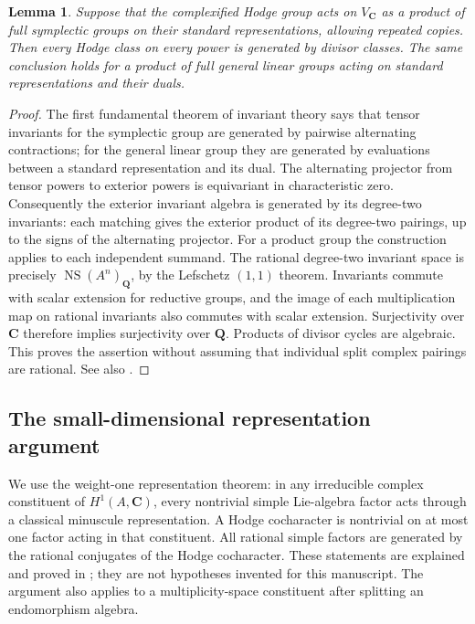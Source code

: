 \documentclass[11pt,reqno]{article}
\theoremstyle{emphasizedplain}
\theoremstyle{emphasizeddefinition}
\theoremstyle{emphasizeddefinition}
\newtheorem{prelemma}{Lemma}
\DeclareMathOperator{\NS}{NS}
\newcommand{\Q}{\mathbf Q}
\newcommand{\C}{\mathbf C}
\begin{document}
\begin{prelemma}\label{p:fft}
Suppose that the complexified Hodge group acts on $V_\C$ as a product of full
symplectic groups on their standard representations, allowing repeated
copies. Then every Hodge class on every power is generated by divisor
classes. The same conclusion holds for a product of full general linear
groups acting on standard representations and their duals.
\end{prelemma}
\begin{proof}
The first fundamental theorem of invariant theory says that tensor
invariants for the symplectic group are generated by pairwise alternating
contractions; for the general linear group they are generated by evaluations
between a standard representation and its dual. The alternating projector
from tensor powers to exterior powers is equivariant in characteristic zero.
Consequently the exterior invariant algebra is generated by its degree-two
invariants: each matching gives the exterior product of its degree-two
pairings, up to the signs of the alternating projector.
For a product group the construction applies to each independent summand.
The rational degree-two invariant space is precisely $\NS(A^n)_\Q$, by the
Lefschetz $(1,1)$ theorem. Invariants commute with scalar extension for
reductive groups, and the image of each multiplication map on rational
invariants also commutes with scalar extension. Surjectivity over $\C$
therefore implies surjectivity over $\Q$. Products of divisor cycles are
algebraic. This proves the assertion without assuming that individual split
complex pairings are rational. See also \cite[Theorem 2.14]{Moonen}.
\end{proof}

\subsection*{The small-dimensional representation argument}
We use the weight-one representation theorem: in any irreducible complex
constituent of $H^1(A,\C)$, every nontrivial simple Lie-algebra factor acts
through a classical minuscule representation. A Hodge cocharacter is
nontrivial on at most one factor acting in that constituent. All rational
simple factors are generated by the rational conjugates of the Hodge
cocharacter. These statements are explained and proved in
\cite[\S3, especially (3.9)--(3.13)]{Moonen}; they are not hypotheses invented
for this manuscript. The argument also applies to a multiplicity-space
constituent after splitting an endomorphism algebra.
\end{document}
